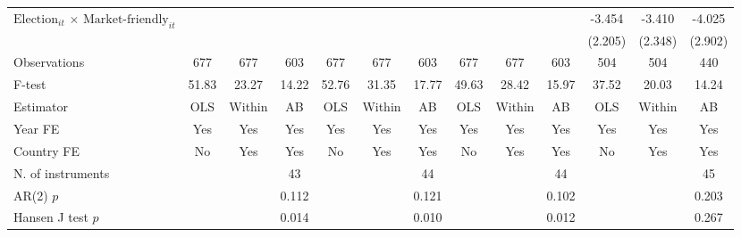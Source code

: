 \begin{longtable}{m{4cm}*{12}{c}}
\multirow{2}{4cm}{$\text{Election}_{it}$ $\times$ $\text{Market-friendly}_{it}$}&               &               &               &               &               &               &               &               &               &      -3.454   &      -3.410   &      -4.025   \\
                    &               &               &               &               &               &               &               &               &               &     (2.205)   &     (2.348)   &     (2.902)   \\
\midrule
Observations        &         677   &         677   &         603   &         677   &         677   &         603   &         677   &         677   &         603   &         504   &         504   &         440   \\
F-test              &       51.83   &       23.27   &       14.22   &       52.76   &       31.35   &       17.77   &       49.63   &       28.42   &       15.97   &       37.52   &       20.03   &       14.24   \\
Estimator           &         OLS   &      Within   &          AB   &         OLS   &      Within   &          AB   &         OLS   &      Within   &          AB   &         OLS   &      Within   &          AB   \\
Year FE             &         Yes   &         Yes   &         Yes   &         Yes   &         Yes   &         Yes   &         Yes   &         Yes   &         Yes   &         Yes   &         Yes   &         Yes   \\
Country FE          &          No   &         Yes   &         Yes   &          No   &         Yes   &         Yes   &          No   &         Yes   &         Yes   &          No   &         Yes   &         Yes   \\
N. of instruments   &               &               &          43   &               &               &          44   &               &               &          44   &               &               &          45   \\
AR(2) \(p\)         &               &               &       0.112   &               &               &       0.121   &               &               &       0.102   &               &               &       0.203   \\
Hansen J test \(p\) &               &               &       0.014   &               &               &       0.010   &               &               &       0.012   &               &               &       0.267   \\

\end{longtable}
